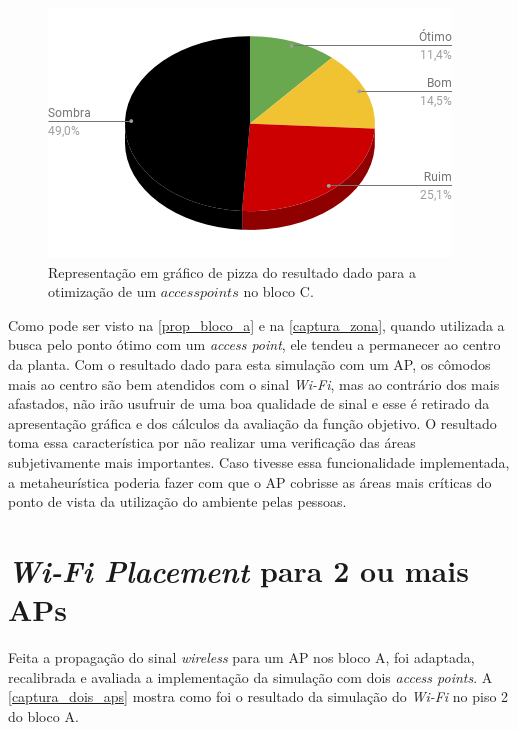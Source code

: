 \documentclass[
	12pt,				%
	twoside,			%
	a4paper,			%
	english,			%
	french,				%
	spanish,			%
	brazil				%
	]{abntex2}
\begin{document}
\begin{figure}[ht]
    \caption{\label{prop_bloco_percent_c_1} Representação em gráfico de pizza do resultado dado para a otimização
     de um $access points$ no bloco C. }
    \begin{center}
        \includegraphics[scale=0.7]{imagens/prop-bloco-percent-c-1.png}
    \end{center}
\end{figure}

Como pode ser visto na \autoref{prop_bloco_a} e na
\autoref{captura_zona}, quando utilizada a busca pelo ponto ótimo com um
\emph{access point}, ele tendeu a permanecer ao centro da planta. Com o
resultado dado para esta simulação com um AP, os cômodos mais ao centro
são bem atendidos com o sinal \emph{Wi-Fi}, mas ao contrário dos mais
afastados, não irão usufruir de uma boa qualidade de sinal e esse é
retirado da apresentação gráfica e dos cálculos da avaliação da função
objetivo. O resultado toma essa característica por não realizar uma
verificação das áreas subjetivamente mais importantes. Caso tivesse essa
funcionalidade implementada, a metaheurística poderia fazer com que o AP
cobrisse as áreas mais críticas do ponto de vista da utilização do
ambiente pelas pessoas.

\section{\texorpdfstring{\emph{Wi-Fi Placement} para 2 ou mais
APs}{Wi-Fi Placement para 2 ou mais APs}}\label{wi-fi-placement-para-2-ou-mais-aps}

Feita a propagação do sinal \emph{wireless} para um AP nos bloco A, foi
adaptada, recalibrada e avaliada a implementação da simulação com dois
\emph{access points}. A \autoref{captura_dois_aps} mostra como foi o
resultado da simulação do \emph{Wi-Fi} no piso 2 do bloco A.
\end{document}
